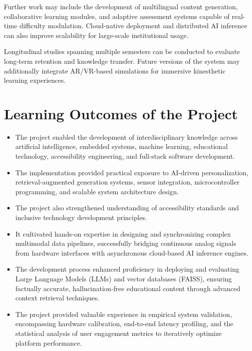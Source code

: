 Further work may include the development of multilingual content generation, collaborative learning modules, and adaptive assessment systems capable of real-time difficulty modulation. Cloud-native deployment and distributed AI inference can also improve scalability for large-scale institutional usage.

Longitudinal studies spanning multiple semesters can be conducted to evaluate long-term retention and knowledge transfer. Future versions of the system may additionally integrate AR/VR-based simulations for immersive kinesthetic learning experiences.

\section{Learning Outcomes of the Project}
\begin{itemize}
\item The project enabled the development of interdisciplinary knowledge across artificial intelligence, embedded systems, machine learning, educational technology, accessibility engineering, and full-stack software development.
\item The implementation provided practical exposure to AI-driven personalization, retrieval-augmented generation systems, sensor integration, microcontroller programming, and scalable system architecture design.
\item The project also strengthened understanding of accessibility standards and inclusive technology development principles.
\item It cultivated hands-on expertise in designing and synchronizing complex multimodal data pipelines, successfully bridging continuous analog signals from hardware interfaces with asynchronous cloud-based AI inference engines.
\item The development process enhanced proficiency in deploying and evaluating Large Language Models (LLMs) and vector databases (FAISS), ensuring factually accurate, hallucination-free educational content through advanced context retrieval techniques.
\item The project provided valuable experience in empirical system validation, encompassing hardware calibration, end-to-end latency profiling, and the statistical analysis of user engagement metrics to iteratively optimize platform performance.
\end{itemize}

